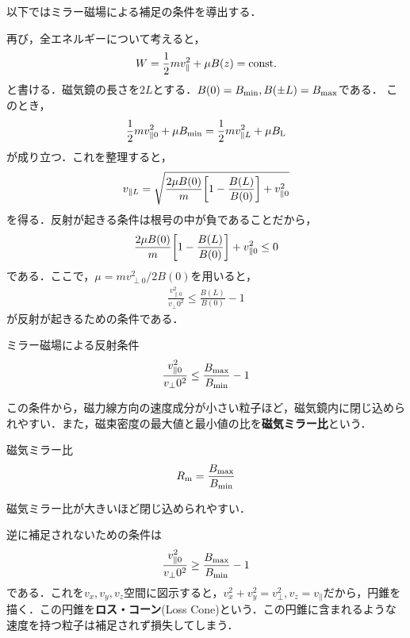 \documentclass{report}
\begin{document}
        以下ではミラー磁場による補足の条件を導出する．
        
        再び，全エネルギーについて考えると，
        \begin{align}
          W = \frac{1}{2}mv_{\parallel}^2 + \mu B(z) = \mathrm{const.}
        \end{align}
        と書ける．磁気鏡の長さを$2L$とする．$B(0) = B_{\mathrm{min}},B(\pm L ) = B_{\mathrm{max}}$である．
        このとき，
        \begin{align}
          \frac{1}{2}mv_{\parallel0}^2 + \mu B_{\mathrm{min}} = \frac{1}{2}mv_{\parallel L}^2 + \mu B_{\mathrm{L}}
        \end{align}
        が成り立つ．これを整理すると，
        \begin{align}
          v_{\parallel L} = \sqrt{\frac{2\mu B(0)}{m}\qty[1 - \frac{B(L)}{B(0)}] + v_{\parallel 0}^2}
        \end{align}
        を得る．反射が起きる条件は根号の中が負であることだから，
        \begin{align}
          \frac{2\mu B(0)}{m}\qty[1 - \frac{B(L)}{B(0)}] + v_{\parallel 0}^2 \leq 0
        \end{align}
        である．ここで，$\mu = mv_{\perp0}^2/2B(0)$を用いると，
        \begin{align}
          \frac{v_{\parallel 0}^2}{v_\perp0^2} \leq \frac{B(L)}{B(0)} - 1
        \end{align}
        が反射が起きるための条件である．
        \begin{itembox}[l]{ミラー磁場による反射条件}
          \begin{align}
            \frac{v_{\parallel 0}^2}{v_\perp0^2} \leq \frac{B_{\mathrm{max}}}{B_{\mathrm{min}}} - 1
          \end{align}
        \end{itembox}
        この条件から，磁力線方向の速度成分が小さい粒子ほど，磁気鏡内に閉じ込められやすい．また，磁束密度の最大値と最小値の比を\textbf{磁気ミラー比}という．
        \begin{itembox}[l]{磁気ミラー比}
          \begin{align}
            R_{\mathrm{m}} = \frac{B_{\mathrm{max}}}{B_{\mathrm{min}}}
          \end{align}
        \end{itembox}
        磁気ミラー比が大きいほど閉じ込められやすい．

        逆に補足されないための条件は
        \begin{align}
          \frac{v_{\parallel 0}^2}{v_\perp0^2} \geq \frac{B_{\mathrm{max}}}{B_{\mathrm{min}}} - 1
        \end{align}
        である．これを$v_x,v_y,v_z$空間に図示すると，$v_x^2 + v_y^2 = v_\perp^2, v_z = v_\parallel$だから，円錐を描く．この円錐を\textbf{ロス・コーン}(Loss Cone)という．この円錐に含まれるような速度を持つ粒子は補足されず損失してしまう．
\end{document}

